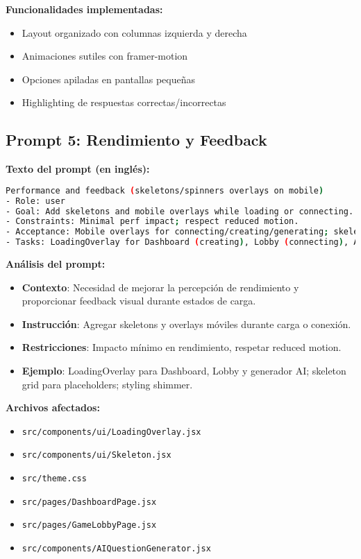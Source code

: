 \documentclass[12pt,a4paper]{article}
\begin{document}
\textbf{Funcionalidades implementadas:}
\begin{itemize}
    \item Layout organizado con columnas izquierda y derecha
    \item Animaciones sutiles con framer-motion
    \item Opciones apiladas en pantallas pequeñas
    \item Highlighting de respuestas correctas/incorrectas
\end{itemize}

\subsection{Prompt 5: Rendimiento y Feedback}

\textbf{Texto del prompt (en inglés):}
\begin{lstlisting}[language=bash]
Performance and feedback (skeletons/spinners overlays on mobile)
- Role: user
- Goal: Add skeletons and mobile overlays while loading or connecting.
- Constraints: Minimal perf impact; respect reduced motion.
- Acceptance: Mobile overlays for connecting/creating/generating; skeletons for grids.
- Tasks: LoadingOverlay for Dashboard (creating), Lobby (connecting), AI generator (loading); skeleton grid in Dashboard and Lobby list placeholders; shimmer styling.
\end{lstlisting}

\textbf{Análisis del prompt:}
\begin{itemize}
    \item \textbf{Contexto}: Necesidad de mejorar la percepción de rendimiento y proporcionar feedback visual durante estados de carga.
    \item \textbf{Instrucción}: Agregar skeletons y overlays móviles durante carga o conexión.
    \item \textbf{Restricciones}: Impacto mínimo en rendimiento, respetar reduced motion.
    \item \textbf{Ejemplo}: LoadingOverlay para Dashboard, Lobby y generador AI; skeleton grid para placeholders; styling shimmer.
\end{itemize}

\textbf{Archivos afectados:}
\begin{itemize}
    \item \texttt{src/components/ui/LoadingOverlay.jsx}
    \item \texttt{src/components/ui/Skeleton.jsx}
    \item \texttt{src/theme.css}
    \item \texttt{src/pages/DashboardPage.jsx}
    \item \texttt{src/pages/GameLobbyPage.jsx}
    \item \texttt{src/components/AIQuestionGenerator.jsx}
\end{itemize}
\end{document}
